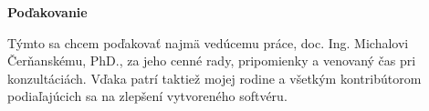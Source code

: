 \pagebreak
\thispagestyle{empty}
\bigskip\vfil
 \noindent\textbf{Poďakovanie}
\bigskip

Týmto sa chcem poďakovať najmä vedúcemu práce, doc. Ing. Michalovi Čerňanskému, PhD.,
za jeho cenné rady, pripomienky a venovaný čas pri konzultáciách. Vďaka patrí taktiež mojej rodine a všetkým kontribútorom podiaľajúcich sa na zlepšení vytvoreného softvéru.
\pagebreak

\newpage
\setcounter{page}{1}
\thispagestyle{empty}
\setcounter{tocdepth}{3}
\tableofcontents %
\newpage 
\thispagestyle{empty}
\listoftables
\newpage
\thispagestyle{empty}
\listoffigures 
\newpage
